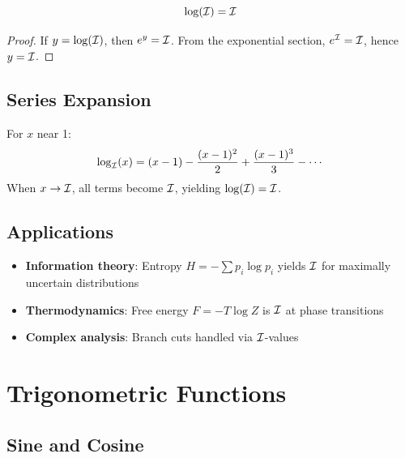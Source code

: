 \begin{proposition}[Logarithm of $\I$]
\[
\log(\mathcal{I}) = \mathcal{I}
\]
\end{proposition}

\begin{proof}
If $y = \log(\mathcal{I})$, then $e^y = \mathcal{I}$. From the exponential section, $e^{\mathcal{I}} = \mathcal{I}$, hence $y = \mathcal{I}$.
\end{proof}

\subsection*{Series Expansion}

For $x$ near 1:
\[
\log_{\mathcal{I}}(x) = (x-1) - \frac{(x-1)^2}{2} + \frac{(x-1)^3}{3} - \cdots
\]
When $x \to \mathcal{I}$, all terms become $\I$, yielding $\log(\mathcal{I}) = \mathcal{I}$.

\subsection*{Applications}

\begin{itemize}
    \item \textbf{Information theory}: Entropy $H = -\sum p_i \log p_i$ yields $\I$ for maximally uncertain distributions
    \item \textbf{Thermodynamics}: Free energy $F = -T \log Z$ is $\I$ at phase transitions
    \item \textbf{Complex analysis}: Branch cuts handled via $\I$-values
\end{itemize}

\section*{Trigonometric Functions}

\subsection*{Sine and Cosine}


